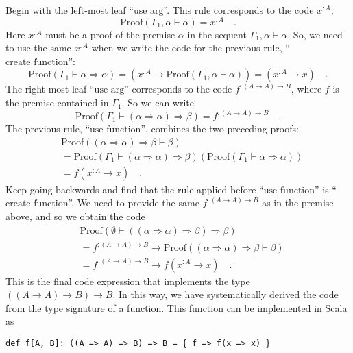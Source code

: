 Begin with the left-most leaf ``$\text{use arg}$''. This rule corresponds
to the code $x^{:A}$,
\[
\text{Proof}\left(\Gamma_{1},\alpha\vdash\alpha\right)=x^{:A}\quad.
\]
Here $x^{:A}$ must be a proof of the premise $\alpha$ in the sequent
$\Gamma_{1},\alpha\vdash\alpha$. So, we need to use the same $x^{:A}$
when we write the code for the previous rule, ``$\text{create function}$'':
\[
\text{Proof}\left(\Gamma_{1}\vdash\alpha\Rightarrow\alpha\right)=(x^{:A}\rightarrow\text{Proof}\left(\Gamma_{1},\alpha\vdash\alpha\right))=(x^{:A}\rightarrow x)\quad.
\]
The right-most leaf ``$\text{use arg}$'' corresponds to the code
$f^{:(A\rightarrow A)\rightarrow B}$, where $f$ is the premise contained
in $\Gamma_{1}$. So we can write
\[
\text{Proof}\left(\Gamma_{1}\vdash(\alpha\Rightarrow\alpha)\Rightarrow\beta\right)=f^{:(A\rightarrow A)\rightarrow B}\quad.
\]
The previous rule, ``$\text{use function}$'', combines the two
preceding proofs:
\begin{align*}
 & \text{Proof}\left((\alpha\Rightarrow\alpha)\Rightarrow\beta\vdash\beta\right)\\
 & =\text{Proof}(\Gamma_{1}\vdash(\alpha\Rightarrow\alpha)\Rightarrow\beta)\left(\text{Proof}(\Gamma_{1}\vdash\alpha\Rightarrow\alpha)\right)\\
 & =f(x^{:A}\rightarrow x)\quad.
\end{align*}
Keep going backwards and find that the rule applied before ``$\text{use function}$''
is ``$\text{create function}$''. We need to provide the same $f^{:\left(A\rightarrow A\right)\rightarrow B}$
as in the premise above, and so we obtain the code
\begin{align*}
 & \text{Proof}\left(\emptyset\vdash((\alpha\Rightarrow\alpha)\Rightarrow\beta)\Rightarrow\beta\right)\\
 & =f^{:\left(A\rightarrow A\right)\rightarrow B}\rightarrow\text{Proof}\left((\alpha\Rightarrow\alpha)\Rightarrow\beta\vdash\beta\right)\\
 & =f^{:\left(A\rightarrow A\right)\rightarrow B}\rightarrow f(x^{:A}\rightarrow x)\quad.
\end{align*}
This is the final code expression that implements the type $(\left(A\rightarrow A\right)\rightarrow B)\rightarrow B$.
In this way, we have systematically derived the code from the type
signature of a function. This function can be implemented in Scala
as
\begin{lstlisting}
def f[A, B]: ((A => A) => B) => B = { f => f(x => x) }
\end{lstlisting}

